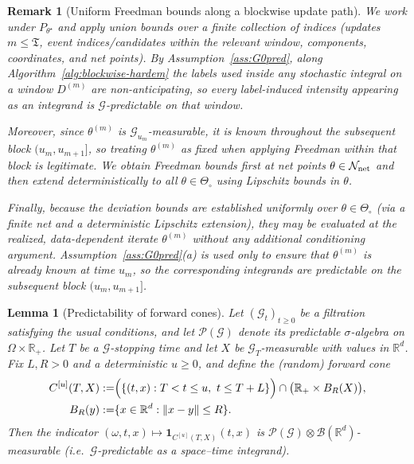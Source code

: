 \documentclass{statsoc}
\newtheorem{lemma}[lemma]{Lemma}
\newtheorem{remark}[remark]{Remark}
\newcommand{\1}{\mathbbm{1}}
\newcommand{\Tmax}{\mathfrak{T}}
\begin{document}
\begin{remark}[Uniform Freedman bounds along a blockwise update path]\label{rem:conditional-freedman}
We work under $P_{\theta^\star}$ and apply union bounds over a finite collection of indices
(updates $m\le\Tmax$, event indices/candidates within the relevant window, components, coordinates, and net points).
By Assumption~\ref{ass:G0pred}, along Algorithm~\ref{alg:blockwise-hardem} the labels used inside any stochastic integral
on a window $D^{(m)}$ are non-anticipating, so every label-induced intensity appearing as an integrand is $\mathcal G$-predictable
on that window.

Moreover, since $\theta^{(m)}$ is $\mathcal G_{u_m}$-measurable, it is known throughout the subsequent block $(u_m,u_{m+1}]$,
so treating $\theta^{(m)}$ as fixed when applying Freedman within that block is legitimate.
We obtain Freedman bounds first at net points $\theta\in\mathcal N_{\rm net}$ and then extend deterministically to all
$\theta\in\Theta_\circ$ using Lipschitz bounds in $\theta$.

Finally, because the deviation bounds are established uniformly over $\theta\in\Theta_\circ$ (via a finite net and a deterministic Lipschitz extension), they may be evaluated at the realized, data-dependent iterate $\theta^{(m)}$ without any additional conditioning argument. Assumption~\ref{ass:G0pred}(a) is used only to ensure that $\theta^{(m)}$ is already known at time $u_m$, so the corresponding integrands are predictable on the subsequent block $(u_m,u_{m+1}]$.
\end{remark}


\begin{lemma}[Predictability of forward cones]\label{lem:predictable-cone}
Let $(\mathcal G_t)_{t\ge 0}$ be a filtration satisfying the usual conditions, and let
$\mathcal P(\mathcal G)$ denote its predictable $\sigma$-algebra on $\Omega\times\mathbb R_+$.
Let $T$ be a $\mathcal G$-stopping time and let $X$ be $\mathcal G_T$-measurable with values in
$\mathbb R^d$. Fix $L,R>0$ and a deterministic $u\ge 0$, and define the (random) forward cone
\begin{align*}
C^{[u]}(T,X)
:=& \Bigl(\{(t,x): T<t\le u,\ t\le T+L\}\Bigr)\cap\bigl(\mathbb R_+\times B_R(X)\bigr),\\
B_R(y):=&\{x\in\mathbb R^d:\|x-y\|\le R\}.
\end{align*}
Then the indicator $(\omega,t,x)\mapsto \mathbf 1_{C^{[u]}(T,X)}(t,x)$ is
$\mathcal P(\mathcal G)\otimes \mathcal B(\mathbb R^d)$-measurable (i.e.\ $\mathcal G$-predictable
as a space--time integrand).
\end{lemma}
\end{document}
